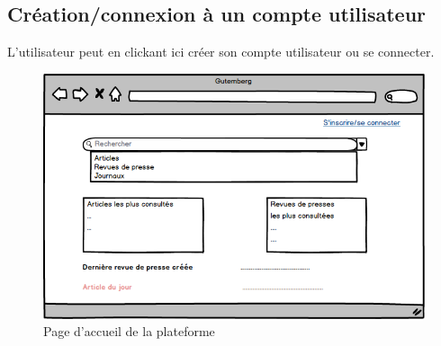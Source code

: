 \subsection{Création/connexion à un compte utilisateur}
\label{sec:arrivee_utilisateur}
L’utilisateur peut en clickant ici créer son compte utilisateur ou se connecter.

    \begin{figure}[H]
        \centering
        \includegraphics[width=\textwidth]{figures/Accueil.png}
            \caption{Page d'accueil de la plateforme}
            \label{fig:accueil}
    \end{figure}